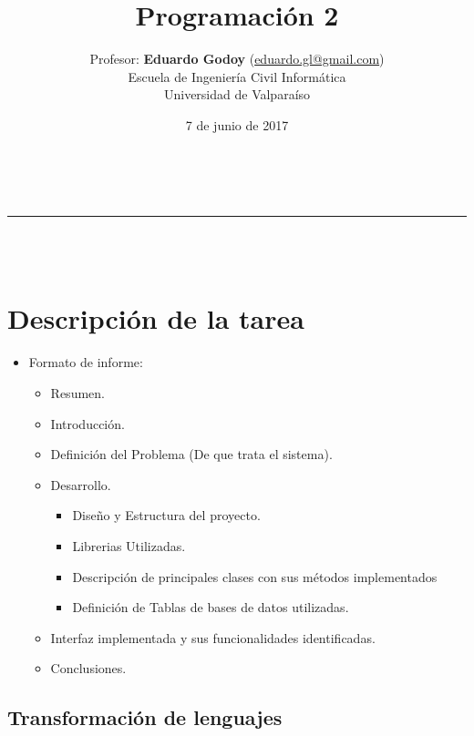 \documentclass[a4paper,10pt]{article}
\makeatletter
\newcommand{\linia}{\rule{\linewidth}{0.5pt}}
\theoremstyle{mytheor}
\renewcommand{\maketitle}{
    \begin{center}
        \vspace{2ex}
        {\huge \textsc{\@title}}
        \vspace{1ex} \\
        \linia \\
        \hfill \@date  \\
        \@author
        \vspace{4ex}
    \end{center}
}
\makeatother
\begin{document}
\title{{\huge Programaci\'on 2}}

\date{7 de junio de 2017}

\author{Profesor: \textbf{Eduardo Godoy} (\href{mailto:eduardo.gl@gmail.com}{eduardo.gl@gmail.com}) \\ Escuela de Ingenier\'ia Civil  Inform\'atica \\ Universidad de Valpara\'iso \\}

\maketitle

\section{Descripci\'on de la tarea}

\begin{itemize}
    \item Formato de informe:
\begin{itemize}
  \item Resumen.
  \item Introducci\'on.
  \item Definici\'on del Problema (De que trata el sistema).
  \item Desarrollo.
    \begin{itemize}
      \item Diseño y Estructura del proyecto.
      \item Librerias Utilizadas.
      \item Descripción de principales clases con sus métodos implementados
      \item Definición de Tablas de bases de datos utilizadas.
    \end{itemize}
  \item Interfaz implementada y sus funcionalidades identificadas.
  \item Conclusiones.
\end{itemize}

\end{itemize}

\subsection{Transformaci\'on de lenguajes}
\end{document}
